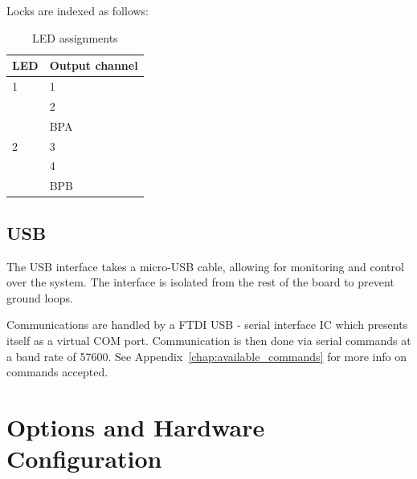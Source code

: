 \documentclass[11pt]{report}
\newcommand{\baudrate}{57600}
\begin{document}
Locks are indexed as follows:

\begin{table}[h!]
	
	\centering

	\begin{tabular}{ll}
	\toprule
	\textbf{LED} 	& \textbf{Output channel} 		\\ \midrule
	1		&	1					\\
			& 	2					\\
			& 	BPA					\\ \midrule
	2		& 	3					\\
			& 	4					\\
			& 	BPB					\\ \bottomrule
	\end{tabular}
	\caption{LED assignments}
	\label{tab:led_assignments}
\end{table}

\section{USB}

The USB interface takes a micro-USB cable, allowing for monitoring and control over the system. The interface is isolated from the rest of the board to prevent ground loops. 

Communications are handled by a FTDI USB - serial interface IC which presents itself as a virtual COM port. Communication is then done via serial commands at a baud rate of \baudrate. See Appendix~\ref{chap:available_commands} for more info on commands accepted. 





\chapter{Options and Hardware Configuration} %
\label{sec:options_and_hardware_configuration}
\end{document}
